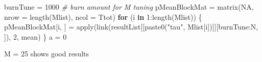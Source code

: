 \documentclass[
]{article}
\newenvironment{Shaded}{\begin{snugshade}}{\end{snugshade}}
\newcommand{\AttributeTok}[1]{\textcolor[rgb]{0.77,0.63,0.00}{#1}}
\newcommand{\CommentTok}[1]{\textcolor[rgb]{0.56,0.35,0.01}{\textit{#1}}}
\newcommand{\ConstantTok}[1]{\textcolor[rgb]{0.00,0.00,0.00}{#1}}
\newcommand{\ControlFlowTok}[1]{\textcolor[rgb]{0.13,0.29,0.53}{\textbf{#1}}}
\newcommand{\DecValTok}[1]{\textcolor[rgb]{0.00,0.00,0.81}{#1}}
\newcommand{\FunctionTok}[1]{\textcolor[rgb]{0.00,0.00,0.00}{#1}}
\newcommand{\NormalTok}[1]{#1}
\newcommand{\OtherTok}[1]{\textcolor[rgb]{0.56,0.35,0.01}{#1}}
\newcommand{\SpecialCharTok}[1]{\textcolor[rgb]{0.00,0.00,0.00}{#1}}
\newcommand{\StringTok}[1]{\textcolor[rgb]{0.31,0.60,0.02}{#1}}
\begin{document}
\begin{Shaded}
\begin{Highlighting}[]
\NormalTok{burnTune }\OtherTok{=} \DecValTok{1000}  \CommentTok{\# burn amount for M tuning}
\NormalTok{pMeanBlockMat }\OtherTok{=} \FunctionTok{matrix}\NormalTok{(}\ConstantTok{NA}\NormalTok{, }\AttributeTok{nrow =} \FunctionTok{length}\NormalTok{(Mlist), }\AttributeTok{ncol =}\NormalTok{ Ttot)}
\ControlFlowTok{for}\NormalTok{ (i }\ControlFlowTok{in} \DecValTok{1}\SpecialCharTok{:}\FunctionTok{length}\NormalTok{(Mlist)) \{}
\NormalTok{    pMeanBlockMat[i, ] }\OtherTok{=} \FunctionTok{apply}\NormalTok{(}\FunctionTok{link}\NormalTok{(resultList[[}\FunctionTok{paste0}\NormalTok{(}\StringTok{"tau"}\NormalTok{, Mlist[i])]][burnTune}\SpecialCharTok{:}\NormalTok{N,}
\NormalTok{        ]), }\DecValTok{2}\NormalTok{, mean)}
\NormalTok{\}}
\NormalTok{a }\OtherTok{=} \DecValTok{0}
\end{Highlighting}
\end{Shaded}

M = 25 shows good results
\end{document}
